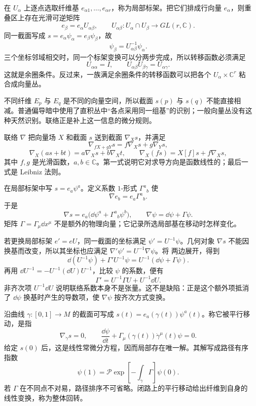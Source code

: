 在 \(U_\alpha\) 上逐点选取纤维基
\(e_{\alpha1},\ldots,e_{\alpha r}\)，称为局部标架。把它们排成行向量 \(e_\alpha\)，则重叠区上存在光滑可逆矩阵
\[
e_\beta=e_\alpha U_{\alpha\beta},
\qquad U_{\alpha\beta}:U_\alpha\cap U_\beta\to GL(r,\mathbb C).
\]
同一截面写成
\(s=e_\alpha\psi_\alpha=e_\beta\psi_\beta\)，故
\[
\psi_\beta=U_{\alpha\beta}^{-1}\psi_\alpha.
\]
三个坐标邻域相交时，同一个标架变换可以分两步完成，所以转移函数必须满足
\[
U_{\alpha\alpha}=I,
\qquad U_{\alpha\beta}U_{\beta\gamma}=U_{\alpha\gamma}.
\]
这就是余圈条件。反过来，一族满足余圈条件的转移函数可以把各个 \(U_\alpha\times\mathbb C^r\) 粘合成向量丛。

不同纤维 \(E_p\) 与 \(E_q\) 是不同的向量空间，所以截面 \(s(p)\) 与 \(s(q)\) 不能直接相减。普通偏导暗中使用了直积丛中“各点采用同一组基”的识别；一般向量丛没有这种天然识别。联络正是补上这一信息的微分规则。

\begin{definition}[联络]
联络 \(\nabla\) 把向量场 \(X\) 和截面 \(s\) 送到截面 \(\nabla_Xs\)，并满足
\[
\nabla_{fX+gY}s=f\nabla_Xs+g\nabla_Ys,
\]
\[
\nabla_X(as+bt)=a\nabla_Xs+b\nabla_Xt,
\qquad
\nabla_X(fs)=X[f]s+f\nabla_Xs,
\]
其中 \(f,g\) 是光滑函数，\(a,b\in\mathbb C\)。第一式说明它对求导方向是函数线性的；最后一式是 Leibniz 法则。
\end{definition}

在局部标架中写 \(s=e_a\psi^a\)。定义系数 \(1\)-形式 \(\Gamma^a{}_b\) 使
\[
\nabla e_b=e_a\Gamma^a{}_b.
\]
于是
\begin{equation}
\nabla s=e_a\bigl(\dd\psi^a+\Gamma^a{}_b\psi^b\bigr),
\qquad
\nabla\psi=\dd\psi+\Gamma\psi.
\label{eq:local-connection-primer}
\end{equation}
矩阵 \(\Gamma=\Gamma_\mu\dd x^\mu\) 不是额外的物理向量；它记录所选局部基在移动时怎样变化。

若更换局部标架 \(e'=eU\)，同一截面的坐标满足 \(\psi'=U^{-1}\psi\)。几何对象 \(\nabla s\) 不能因换基而改变，所以其坐标也应满足
\(\nabla'\psi'=U^{-1}\nabla\psi\)。将  两边展开，得到
\[
\dd(U^{-1}\psi)+\Gamma'U^{-1}\psi
=U^{-1}(\dd\psi+\Gamma\psi).
\]
再用 \(\dd U^{-1}=-U^{-1}(\dd U)U^{-1}\)，比较 \(\psi\) 的系数，便有
\begin{equation}
\Gamma'=U^{-1}\Gamma U+U^{-1}\dd U.
\label{eq:connection-transform-primer}
\end{equation}
非齐次项 \(U^{-1}\dd U\) 说明联络系数本身不是张量。这不是缺陷：正是这个额外项抵消了 \(\dd\psi\) 换基时产生的导数项，使 \(\nabla\psi\) 按齐次方式变换。

沿曲线 \(\gamma:[0,1]\to M\) 的截面可写成 \(s(t)=e_a(\gamma(t))\psi^a(t)\)。称它被平行移动，是指
\[
\nabla_{\dot\gamma}s=0,
\qquad
\frac{\dd\psi}{\dd t}
+\Gamma_\mu(\gamma(t))\dot\gamma^\mu(t)\psi=0.
\]
给定 \(s(0)\) 后，这是线性常微分方程，因而局部存在唯一解。其解写成路径有序指数
\[
\psi(1)=
\mathcal P\exp\!\left[-\int_\gamma\Gamma\right]\psi(0).
\]
若 \(\Gamma\) 在不同点不对易，路径排序不可省略。闭路上的平行移动给出纤维到自身的线性变换，称为整体回转。

